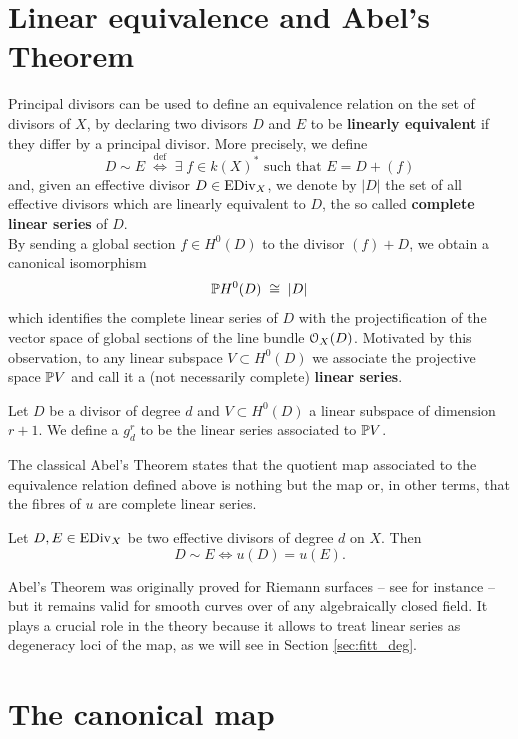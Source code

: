 \section{Linear equivalence and Abel's Theorem}

	Principal divisors can be used to define an equivalence relation on the set of divisors of $X$, by declaring two divisors $D$ and $E$ to be \textbf{linearly equivalent} if they differ by a principal divisor. More precisely, we define
	$$ D\sim E \;\overset{\text{def}}\iff\; \exists\; f \in k(X)^* \text{ such that } E = D + (f) $$
	and, given an effective divisor $D\in \operatorname{EDiv}_X$, we denote by $|D|$ the set of all effective divisors which are linearly equivalent to $D$, the so called \textbf{complete linear series} of $D$.\\
	By sending a global section $f\in H^0(D)$ to the divisor $(f)+D$, we obtain a canonical isomorphism
	$$ \mathbb{P} H^0(D) \;\cong\; |D| $$
	which identifies the complete linear series of $D$ with the projectification of the vector space of global sections of the line bundle $\mathcal{O}_X(D)$. Motivated by this observation, to any linear subspace $V\subset H^0(D)$ we associate the projective space $\mathbb{P} V$ and call it a (not necessarily complete) \textbf{linear series}.
	\begin{defi}
		Let $D$ be a divisor of degree $d$ and $V\subset H^0(D)$ a linear subspace of dimension $r+1$. We define a $g_d^r$ to be the linear series associated to $\mathbb{P} V$.
	\end{defi}

	The classical Abel's Theorem states that the quotient map associated to the equivalence relation defined above is nothing but the \AJJ map or, in other terms, that the fibres of $u$ are complete linear series.
	\begin{namedtheo}\label{thm:Abel}
		Let $D,E \in \operatorname{EDiv}_X$ be two effective divisors of degree $d$ on $X$. Then
		$$ D\sim E \iff u(D) = u(E). $$
	\end{namedtheo}
	Abel's Theorem was originally proved for Riemann surfaces -- see \cite{GAC} for instance -- but it remains valid for smooth curves over of any algebraically closed field. It plays a crucial role in the \BN theory because it allows to treat linear series as degeneracy loci of the \AJJ map, as we will see in Section \ref{sec:fitt_deg}.
	

\section{The canonical map}

